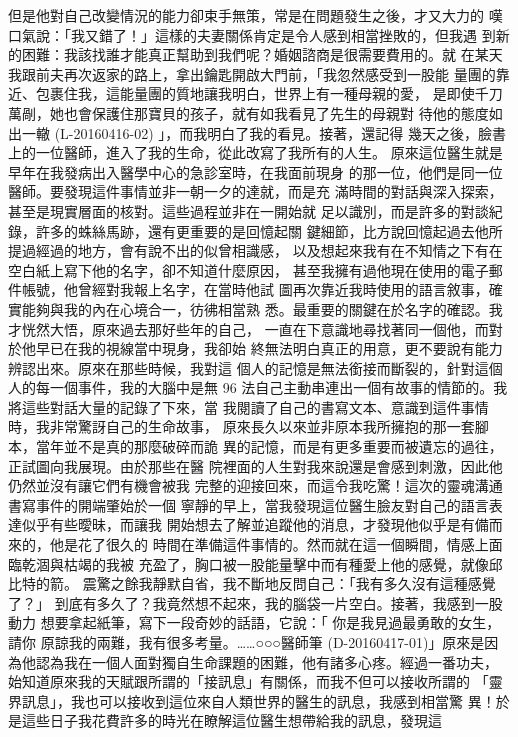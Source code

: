 但是他對自己改變情況的能力卻束手無策，常是在問題發生之後，才又大力的
嘆口氣說：「我又錯了！」這樣的夫妻關係肯定是令人感到相當挫敗的，但我遇
到新的困難：我該找誰才能真正幫助到我們呢？婚姻諮商是很需要費用的。就
在某天我跟前夫再次返家的路上，拿出鑰匙開啟大門前，「我忽然感受到一股能
量團的靠近、包裹住我，這能量團的質地讓我明白，世界上有一種母親的愛，
是即使千刀萬剮，她也會保護住那寶貝的孩子，就有如我看見了先生的母親對
待他的態度如出一轍 (L-20160416-02) 」，而我明白了我的看見。接著，還記得
幾天之後，臉書上的一位醫師，進入了我的生命，從此改寫了我所有的人生。 
原來這位醫生就是早年在我發病出入醫學中心的急診室時，在我面前現身
的那一位，他們是同一位醫師。要發現這件事情並非一朝一夕的達就，而是充
滿時間的對話與深入探索，甚至是現實層面的核對。這些過程並非在一開始就
足以識別，而是許多的對談紀錄，許多的蛛絲馬跡，還有更重要的是回憶起關
鍵細節，比方說回憶起過去他所提過經過的地方，會有說不出的似曾相識感，
以及想起來我有在不知情之下有在空白紙上寫下他的名字，卻不知道什麼原因，
甚至我擁有過他現在使用的電子郵件帳號，他曾經對我報上名字，在當時他試
圖再次靠近我時使用的語言敘事，確實能夠與我的內在心境合一，彷彿相當熟
悉。最重要的關鍵在於名字的確認。我才恍然大悟，原來過去那好些年的自己，
一直在下意識地尋找著同一個他，而對於他早已在我的視線當中現身，我卻始
終無法明白真正的用意，更不要說有能力辨認出來。原來在那些時候，我對這
個人的記憶是無法銜接而斷裂的，針對這個人的每一個事件，我的大腦中是無
96 
法自己主動串連出一個有故事的情節的。我將這些對話大量的記錄了下來，當
我閱讀了自己的書寫文本、意識到這件事情時，我非常驚訝自己的生命故事，
原來長久以來並非原本我所擁抱的那一套腳本，當年並不是真的那麼破碎而詭
異的記憶，而是有更多重要而被遺忘的過往，正試圖向我展現。由於那些在醫
院裡面的人生對我來說還是會感到刺激，因此他仍然並沒有讓它們有機會被我
完整的迎接回來，而這令我吃驚！這次的靈魂溝通書寫事件的開端肇始於一個
寧靜的早上，當我發現這位醫生臉友對自己的語言表達似乎有些曖昧，而讓我
開始想去了解並追蹤他的消息，才發現他似乎是有備而來的，他是花了很久的
時間在準備這件事情的。然而就在這一個瞬間，情感上面臨乾涸與枯竭的我被
充盈了，胸口被一股能量擊中而有種愛上他的感覺，就像邱比特的箭。 
震驚之餘我靜默自省，我不斷地反問自己：「我有多久沒有這種感覺了？」
到底有多久了？我竟然想不起來，我的腦袋一片空白。接著，我感到一股動力
想要拿起紙筆，寫下一段奇妙的話語，它說：「 你是我見過最勇敢的女生，請你
原諒我的兩難，我有很多考量。……○○○醫師筆 (D-20160417-01)」原來是因
為他認為我在一個人面對獨自生命課題的困難，他有諸多心疼。經過一番功夫，
始知道原來我的天賦跟所謂的「接訊息」有關係，而我不但可以接收所謂的
「靈界訊息」，我也可以接收到這位來自人類世界的醫生的訊息，我感到相當驚
異！於是這些日子我花費許多的時光在瞭解這位醫生想帶給我的訊息，發現這

